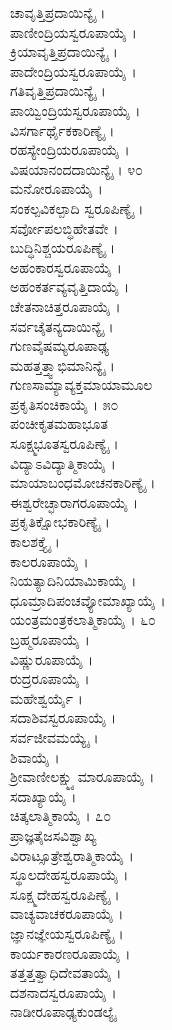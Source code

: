 \begin{multicols}{2}
ಚಾವೃತ್ತಿಪ್ರದಾಯಿನ್ಯೈ ।\\ಪಾಣೀಂದ್ರಿಯಸ್ವರೂಪಾಯೈ ।\\ಕ್ರಿಯಾವೃತ್ತಿಪ್ರದಾಯಿನ್ಯೈ ।\\ಪಾದೇಂದ್ರಿಯಸ್ವರೂಪಾಯೈ ।\\ಗತಿವೃತ್ತಿಪ್ರದಾಯಿನ್ಯೈ ।\\ಪಾಯ್ವಿಂದ್ರಿಯಸ್ವರೂಪಾಯೈ ।\\ವಿಸರ್ಗಾರ್ಥೈಕಕಾರಿಣ್ಯೈ ।\\ರಹಸ್ಯೇಂದ್ರಿಯರೂಪಾಯೈ ।\\ವಿಷಯಾನಂದದಾಯಿನ್ಯೈ । ೪೦\\ಮನೋರೂಪಾಯೈ ।\\ಸಂಕಲ್ಪವಿಕಲ್ಪಾದಿ ಸ್ವರೂಪಿಣ್ಯೈ ।\\ಸರ್ವೋಪಲಬ್ಧಿಹೇತವೇ ।\\ಬುದ್ಧಿನಿಶ್ಚಯರೂಪಿಣ್ಯೈ ।\\ಅಹಂಕಾರಸ್ವರೂಪಾಯೈ ।\\ಅಹಂಕರ್ತವ್ಯವೃತ್ತಿದಾಯೈ ।\\ಚೇತನಾಚಿತ್ತರೂಪಾಯೈ ।\\ಸರ್ವಚೈತನ್ಯದಾಯಿನ್ಯೈ ।\\ಗುಣವೈಷಮ್ಯರೂಪಾಢ್ಯ\\ಮಹತ್ತತ್ತ್ವಾಭಿಮಾನಿನ್ಯೈ ।\\ಗುಣಸಾಮ್ಯಾವ್ಯಕ್ತಮಾಯಾಮೂಲ\\ಪ್ರಕೃತಿಸಂಚಿಕಾಯೈ । ೫೦\\ಪಂಚೀಕೃತಮಹಾಭೂತ\\ಸೂಕ್ಷ್ಮಭೂತಸ್ವರೂಪಿಣ್ಯೈ ।\\ವಿದ್ಯಾಽವಿದ್ಯಾತ್ಮಿಕಾಯೈ ।\\ಮಾಯಾಬಂಧಮೋಚನಕಾರಿಣ್ಯೈ ।\\ಈಶ್ವರೇಚ್ಛಾರಾಗರೂಪಾಯೈ ।\\ಪ್ರಕೃತಿಕ್ಷೋಭಕಾರಿಣ್ಯೈ ।\\ಕಾಲಶಕ್ತ್ಯೈ ।\\ಕಾಲರೂಪಾಯೈ ।\\ನಿಯತ್ಯಾದಿನಿಯಾಮಿಕಾಯೈ ।\\ಧೂಮ್ರಾದಿಪಂಚವ್ಯೋಮಾಖ್ಯಾಯೈ ।\\ಯಂತ್ರಮಂತ್ರಕಲಾತ್ಮಿಕಾಯೈ । ೬೦\\ಬ್ರಹ್ಮರೂಪಾಯೈ ।\\ವಿಷ್ಣುರೂಪಾಯೈ ।\\ರುದ್ರರೂಪಾಯೈ ।\\ಮಹೇಶ್ವರ್ಯೈ ।\\ಸದಾಶಿವಸ್ವರೂಪಾಯೈ ।\\ಸರ್ವಜೀವಮಯ್ಯೈ ।\\ಶಿವಾಯೈ ।\\ಶ್ರೀವಾಣೀಲಕ್ಷ್ಮ್ಯುಮಾರೂಪಾಯೈ ।\\ಸದಾಖ್ಯಾಯೈ ।\\ಚಿತ್ಕಲಾತ್ಮಿಕಾಯೈ । ೭೦\\ಪ್ರಾಜ್ಞತೈಜಸವಿಶ್ವಾಖ್ಯ\\ವಿರಾಟ್ಸೂತ್ರೇಶ್ವರಾತ್ಮಿಕಾಯೈ ।\\ಸ್ಥೂಲದೇಹಸ್ವರೂಪಾಯೈ ।\\ಸೂಕ್ಷ್ಮದೇಹಸ್ವರೂಪಿಣ್ಯೈ ।\\ವಾಚ್ಯವಾಚಕರೂಪಾಯೈ ।\\ಜ್ಞಾನಜ್ಞೇಯಸ್ವರೂಪಿಣ್ಯೈ ।\\ಕಾರ್ಯಕಾರಣರೂಪಾಯೈ ।\\ತತ್ತತ್ತತ್ವಾಧಿದೇವತಾಯೈ ।\\ದಶನಾದಸ್ವರೂಪಾಯೈ ।\\ನಾಡೀರೂಪಾಢ್ಯಕುಂಡಲ್ಯೈ 
\end{multicols}
